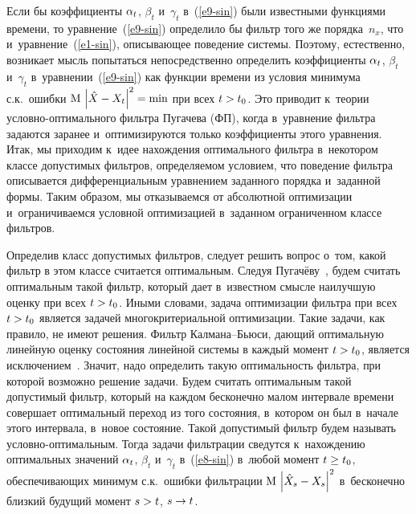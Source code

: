 \begin{multicols}{2}
Если бы коэффициенты  $\alpha_t$, $\beta_t$ и~$\gamma_t$ в~(\ref{e9-sin})
были известными функциями времени, то уравнение~(\ref{e9-sin}) определило
бы фильтр того же  порядка~${n_x}$, что и~уравнение~(\ref{e1-sin}), описывающее поведение системы. Поэтому, естественно,
возникает мысль попытаться непосредственно определить коэффициенты
$\alpha_t$, $\beta_t$ и~$\gamma_t$ в~уравнении~(\ref{e9-sin}) как функции
времени из условия минимума с.к.\ ошибки  $\mathrm{M}\lv
\hat{X} \hm- X_t\rrv^2 =\min$ при всех  $t\hm>t_0$. Это приводит к~теории
услов\-но-оп\-ти\-маль\-но\-го фильт\-ра Пугачева (ФП), когда в~уравнение
фильт\-ра задаются заранее и~оптимизируются только коэффициенты
этого уравнения. Итак, мы приходим к~идее
нахождения оптимального фильт\-ра
в~некотором классе допустимых фильт\-ров,
определяемом условием, что поведение фильт\-ра описывается
дифференциальным уравнением заданного порядка и~заданной формы.
Таким образом, мы отказываемся от абсолютной оптимизации
и~ограничиваемся условной оптимизацией в~заданном ограниченном классе фильтров.

Определив класс допустимых фильтров, следует решить вопрос о~том,
какой фильтр в этом классе считается оптимальным. Следуя Пугачёву~\cite{1-sin}, будем считать оптимальным такой фильтр, который дает в~известном смысле наилучшую оценку при всех $t\hm>t_0$. Иными словами, задача оптимизации фильтра при всех
$t\hm>t_0$ является  задачей многокритериальной оптимизации. Такие
задачи, как правило, не имеют решения. Фильтр Кал\-ма\-на--Бью\-си, дающий
оптимальную линейную оценку состояния линейной системы в каждый
момент $t\hm>t_0$, является исключением~\cite{1-sin}. Значит, надо
определить такую оптимальность фильтра, при которой возможно решение
задачи.
Будем считать оптимальным
такой допустимый фильтр, который на каждом бесконечно малом
интервале времени совершает оптимальный переход из того со\-сто\-яния,
в~котором он был в~начале этого интервала, в~новое со\-сто\-яние.
Такой допустимый фильтр будем называть   услов\-но-оп\-ти\-маль\-ным. Тогда задачи фильтрации сведутся к~нахождению оптимальных значений
 $\alpha_t$, $\beta_t$ и~$\gamma_t$ в~(\ref{e8-sin}) в~любой момент  $t\hm\ge t_0$, обеспечивающих минимум
с.к.\ ошибки фильтрации $\mathrm{M}\lv \hat X_s \hm-
X_s\rrv^2$  в~бесконечно близкий будущий момент  $s\hm> t$, $s\hm\to t$.


\end{multicols}
